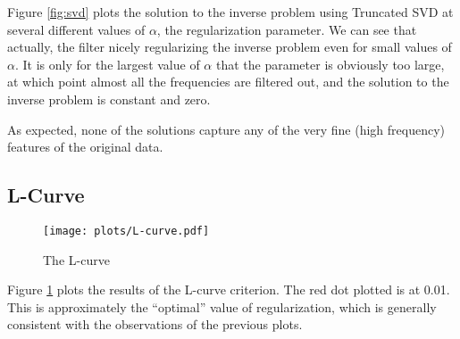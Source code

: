 \documentclass{article}
\begin{document}
Figure \ref{fig:svd} plots the solution to the inverse problem using
Truncated SVD at several different values of $\alpha$, the
regularization parameter. We can see that actually, the filter nicely
regularizing the inverse problem even for small values of $\alpha$. It
is only for the largest value of $\alpha$ that the parameter is obviously
too large, at which point almost all the frequencies are filtered out,
and the solution to the inverse problem is constant and zero. 

As expected, none of the solutions capture any of the very fine (high
frequency) features of the original data. 

\subsection{L-Curve}

\begin{figure}[!htb]
  \texttt{[image: plots/L-curve.pdf]}
  \caption{The L-curve} 
 \label{fig:lcurve}
\end{figure}

Figure \ref{fig:lcurve} plots the results of the L-curve criterion. The
red dot plotted is at 0.01. This is approximately the ``optimal'' value
of regularization, which is generally consistent with the observations
of the previous plots. 
\end{document}
